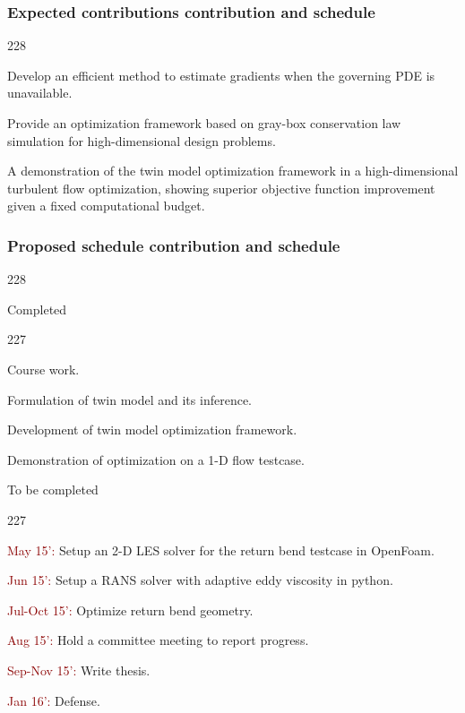 \documentclass{beamer}
\newcommand{\barrow}{\item[\color{darkred}\ding{228}]}
\newcommand{\carrow}{\item[\color{darkred}\ding{227}]}
\begin{document}
\begin{frame}
    \frametitle{Expected contributions \hfill\scriptsize{contribution and schedule}}\small
    \begin{dinglist}{228}
        \barrow Develop an efficient method to estimate gradients when the governing PDE
                is unavailable.\vspace{.2cm}
        \barrow Provide an optimization framework based on gray-box conservation law
                simulation for high-dimensional design problems.\vspace{.2cm}
        \barrow A demonstration of the twin model optimization framework in a high-dimensional
                turbulent flow optimization, showing superior objective function improvement 
                given a fixed computational budget.
    \end{dinglist}
\end{frame}


\begin{frame}
    \frametitle{Proposed schedule \hfill\scriptsize{contribution and schedule}}\small
    \begin{dinglist}{228}
        \barrow Completed\scriptsize
        \begin{dinglist}{227}
            \carrow Course work.\vspace{.08cm}
            \carrow Formulation of twin model and its inference.\vspace{.08cm}
            \carrow Development of twin model optimization framework.\vspace{.08cm}
            \carrow Demonstration of optimization on a 1-D flow testcase.
        \end{dinglist}\vspace{.15cm}\small
        \barrow To be completed\scriptsize
        \begin{dinglist}{227}
            \carrow \textcolor{darkred}{May 15':} Setup an 2-D LES solver for the return bend testcase in OpenFoam.
            \vspace{.08cm}
            \carrow \textcolor{darkred}{Jun 15':} Setup a RANS solver with adaptive eddy viscosity in python.\vspace{.08cm}
            \carrow \textcolor{darkred}{Jul-Oct 15':} Optimize return bend geometry.\vspace{.08cm}
            \carrow \textcolor{darkred}{Aug 15':} Hold a committee meeting to report progress.\vspace{.08cm}
            \carrow \textcolor{darkred}{Sep-Nov 15':} Write thesis.\vspace{.08cm}
            \carrow \textcolor{darkred}{Jan 16':} Defense.
        \end{dinglist}
    \end{dinglist}

\end{frame}
\end{document}
